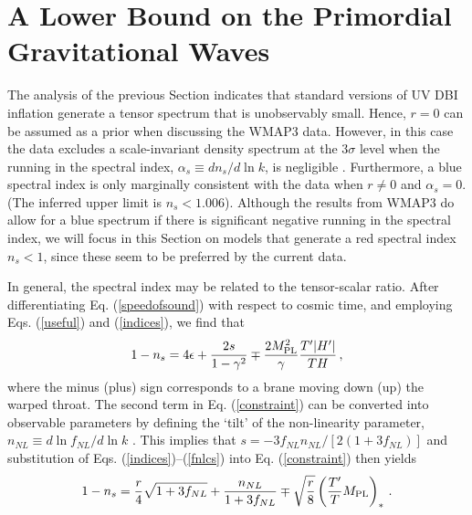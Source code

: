 \section{A Lower Bound on the Primordial Gravitational Waves} 
% 
\label{sec:lower}

The analysis of the previous Section 
indicates that standard versions of UV DBI inflation generate a 
tensor spectrum that is unobservably 
small. Hence, $r=0$ can be assumed as a prior 
when discussing the WMAP3 data. However, in this case the data 
excludes a scale-invariant density spectrum at the $3 \sigma$ level
when the running in the spectral index, $\alpha_s \equiv dn_s/d\ln k$, 
is negligible \cite{spergel}.  
Furthermore, a blue spectral index 
is only marginally consistent with the data when $r\ne 0$ and $\alpha_s=0$. 
(The inferred upper limit is $n_s < 1.006$).
Although the results from WMAP3 do allow for a blue spectrum if there is 
significant negative running in the spectral index, we will 
focus in this Section 
on models that generate a red spectral index $n_s<1$, since these seem 
to be preferred by the current data.   

In general, the spectral index may be related to the tensor-scalar ratio. 
After differentiating Eq. (\ref{speedofsound}) 
with respect to cosmic time, and employing Eqs. (\ref{useful}) 
and (\ref{indices}), we find that 
\begin{equation}
\label{constraint}
1-n_s = 4 \epsilon +\frac{2s}{1-\gamma^2} \mp 
\frac{2M_{\mathrm{PL}}^2}{\gamma} \frac{T'|H'|}{TH}  \,,
\end{equation}
where the minus (plus) sign corresponds to 
a brane moving down (up) the warped throat. 
The second term in Eq. (\ref{constraint}) 
can be converted into observable parameters
by defining the `tilt' of the non-linearity parameter, 
$n_{NL} \equiv d \ln f_{NL}/d\ln k$ \cite{brane14}. 
This implies that $s= - 3 f_{NL} n_{NL} /[2(1+3f_{NL})]$ and     
substitution of Eqs. (\ref{indices})--(\ref{fnlcs}) 
into Eq. (\ref{constraint}) then yields  
\begin{equation}
\label{obscon1}
1-n_s = \frac{r}{4} \sqrt{1+3f_{NL}} + \frac{n_{NL}}{1+3f_{NL}}
\mp \sqrt{\frac{r}{8}} \left( \frac{T'}{T} M_{\mathrm{PL}} \right)_*  \,.
\end{equation}

